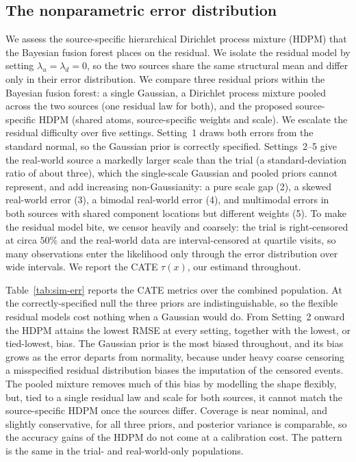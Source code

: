 \subsection{The nonparametric error distribution}\label{sm:sim-error}

We assess the source-specific hierarchical Dirichlet process mixture (HDPM) that the Bayesian fusion forest places on the residual.
We isolate the residual model by setting $\lambda_u = \lambda_d = 0$, so the two sources share the same structural mean and differ only in their error distribution.
We compare three residual priors within the Bayesian fusion forest: a single Gaussian, a Dirichlet process mixture pooled across the two sources (one residual law for both), and the proposed source-specific HDPM (shared atoms, source-specific weights and scale).
We escalate the residual difficulty over five settings.
Setting~1 draws both errors from the standard normal, so the Gaussian prior is correctly specified.
Settings~2--5 give the real-world source a markedly larger scale than the trial (a standard-deviation ratio of about three), which the single-scale Gaussian and pooled priors cannot represent, and add increasing non-Gaussianity: a pure scale gap (2), a skewed real-world error (3), a bimodal real-world error (4), and multimodal errors in both sources with shared component locations but different weights (5).
To make the residual model bite, we censor heavily and coarsely: the trial is right-censored at circa $50\%$ and the real-world data are interval-censored at quartile visits, so many observations enter the likelihood only through the error distribution over wide intervals.
We report the CATE $\tau(x)$, our estimand throughout.

Table~\ref{tab:sim-err} reports the CATE metrics over the combined population.
At the correctly-specified null the three priors are indistinguishable, so the flexible residual models cost nothing when a Gaussian would do.
From Setting~2 onward the HDPM attains the lowest RMSE at every setting, together with the lowest, or tied-lowest, bias.
The Gaussian prior is the most biased throughout, and its bias grows as the error departs from normality, because under heavy coarse censoring a misspecified residual distribution biases the imputation of the censored events.
The pooled mixture removes much of this bias by modelling the shape flexibly, but, tied to a single residual law and scale for both sources, it cannot match the source-specific HDPM once the sources differ.
Coverage is near nominal, and slightly conservative, for all three priors, and posterior variance is comparable, so the accuracy gains of the HDPM do not come at a calibration cost.
The pattern is the same in the trial- and real-world-only populations.

